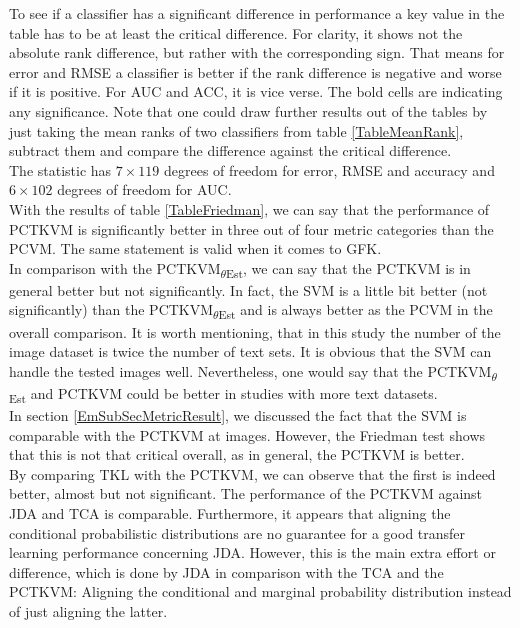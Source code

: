 To see if a classifier has a significant difference in performance a key value in the table has to be at least the critical difference.
For clarity, it shows not the absolute rank difference, but rather with the corresponding sign.
That means for error and \acs{RMSE} a classifier is better if the rank difference is negative and worse if it is positive.
For \acs{AUC} and \acs{ACC}, it is vice verse.
The bold cells are indicating any significance.
Note that one could draw further results out of the tables by just taking the mean ranks of two classifiers from table \ref{TableMeanRank}, subtract them and compare the difference against the critical difference. \\
The statistic has $7\times 119$ degrees of freedom for error, \acs{RMSE} and accuracy and $6\times102$ degrees of freedom for \acs{AUC}.\\
With the results of table \ref{TableFriedman}, we can say that the performance of \acs{PCTKVM} is significantly better in three out of four metric categories than the \acs{PCVM}. The same statement is valid when it comes to \acs{GFK}.\\
In comparison with the \acs{PCTKVM}\textsubscript{$\theta$Est}, we can say that the \acs{PCTKVM} is in general better but not significantly.
In fact, the \acs{SVM} is a little bit better (not significantly) than the \acs{PCTKVM}\textsubscript{$\theta$Est} and is always better as the \acs{PCVM} in the overall comparison.
It is worth mentioning, that in this study the number of the image dataset is twice the number of text sets.
It is obvious that the \acs{SVM} can handle the tested images well. Nevertheless, one would say that the \acs{PCTKVM}\textsubscript{$\theta$Est} and \acs{PCTKVM} could be better in studies with more text datasets.\\
In section \ref{EmSubSecMetricResult}, we discussed the fact that the \acs{SVM} is comparable with the \acs{PCTKVM} at images. However, the Friedman test shows that this is not that critical overall, as in general, the \acs{PCTKVM} is better.\\
By comparing \acs{TKL} with the \acs{PCTKVM}, we can observe that the first is indeed better, almost but not significant.
The performance of the \acs{PCTKVM} against \acs{JDA} and \acs{TCA} is comparable.
Furthermore, it appears that aligning the conditional probabilistic distributions are no guarantee for a good transfer learning performance concerning \acs{JDA}. However, this is the main extra effort or difference, which is done by \acs{JDA} in comparison with the \acs{TCA} and the \acs{PCTKVM}: Aligning the conditional and marginal probability distribution instead of just aligning the latter.\cite{Long.}\cite{Pan.2011}\cite{Long.2015}\\
